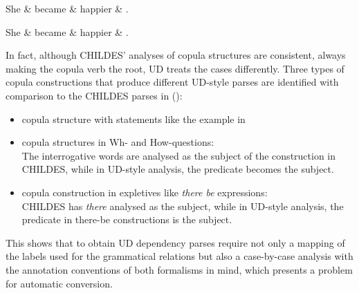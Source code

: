 \begin{minipage}[b]{0.5\linewidth}
\begin{dependency}
	\begin{deptext}[column sep=0.5cm]
	She \& became \& happier \& .\\
	\end{deptext}
\end{dependency}
\end{minipage}
\begin{minipage}[b]{0.5\linewidth}
\begin{dependency}
	\begin{deptext}[column sep=0.5cm]
	She \& became \& happier \& .\\
	\end{deptext}
\end{dependency}
\end{minipage}
\label{fig:become}
\vspace{0.5em}

In fact, although CHILDES' analyses of copula structures are consistent, always making the copula verb the root, UD treats the cases differently. Three types of copula constructions that produce different UD-style parses are identified with comparison to the CHILDES parses in (\cite{liu2021}):
\begin{itemize}
	\item copula structure with statements like the example in 
	\item copula structures in Wh- and How-questions:\\ The interrogative words are analysed as the subject of the construction in CHILDES, while in UD-style analysis, the predicate becomes the subject.
	\item copula construction in expletives like \emph{there be} expressions:\\
	CHILDES has \emph{there} analysed as the subject, while in UD-style analysis, the predicate in there-be constructions is the subject.
\end{itemize}

This shows that to obtain UD dependency parses require not only a mapping of the labels used for the grammatical relations but also a case-by-case analysis with the annotation conventions of both formalisms in mind, which presents a problem for automatic conversion.\\

